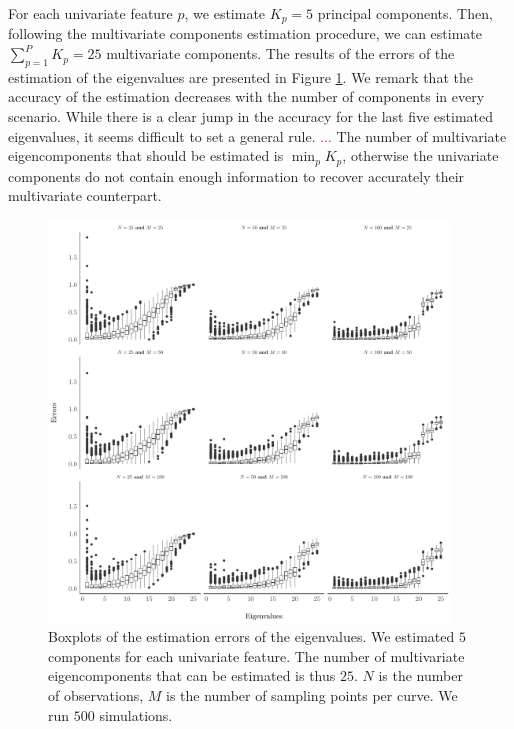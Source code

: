 For each univariate feature $p$, we estimate $K_p = 5$ principal components. Then, following the multivariate components estimation procedure, we can estimate $\sum_{p = 1}^P K_p = 25$ multivariate components. The results of the errors of the estimation of the eigenvalues are presented in Figure \ref{fig:ncomp}. We remark that the accuracy of the estimation decreases with the number of components in every scenario. While there is a clear jump in the accuracy for the last five estimated eigenvalues, it seems difficult to set a general rule. \textcolor{red}{...} The number of multivariate eigencomponents that should be estimated is $\min_p K_p$, otherwise the univariate components do not contain enough information to recover accurately their multivariate counterpart.
\begin{figure}
     \centering
    \includegraphics[width=0.95\textwidth]{figures/ncomp.pdf}
    \caption{Boxplots of the estimation errors of the eigenvalues. We estimated $5$ components for each univariate feature. The number of multivariate eigencomponents that can be estimated is thus $25$. $N$ is the number of observations, $M$ is the number of sampling points per curve. We run $500$ simulations.}
    \label{fig:ncomp}
\end{figure}

